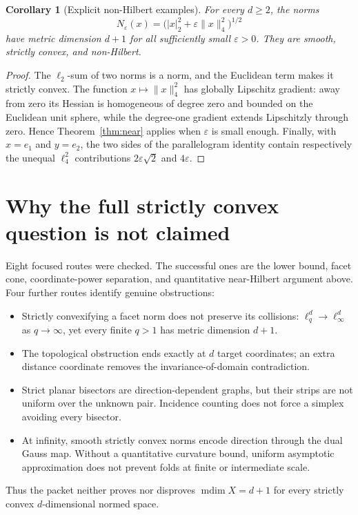 \documentclass[11pt]{amsart}
\newtheorem{corollary}[theorem]{Corollary}
\theoremstyle{remark}
\newcommand{\mdim}{\operatorname{mdim}}
\begin{document}
\begin{corollary}[Explicit non-Hilbert examples]\label{cor:example}
For every $d\ge2$, the norms
\[
 N_\varepsilon(x)
 =\bigl(|x|_2^2+\varepsilon\|x\|_4^2\bigr)^{1/2}
\]
have metric dimension $d+1$ for all sufficiently small $\varepsilon>0$.
They are smooth, strictly convex, and non-Hilbert.
\end{corollary}

\begin{proof}
The $\ell_2$-sum of two norms is a norm, and the Euclidean term makes it
strictly convex.  The function $x\mapsto\|x\|_4^2$ has globally Lipschitz
gradient: away from zero its Hessian is homogeneous of degree zero and bounded
on the Euclidean unit sphere, while the degree-one gradient extends
Lipschitzly through zero.  Hence Theorem~\ref{thm:near} applies when
$\varepsilon$ is small enough.  Finally, with $x=e_1$ and $y=e_2$, the two
sides of the parallelogram identity contain respectively the unequal
$\ell_4^2$ contributions $2\varepsilon\sqrt2$ and $4\varepsilon$.
\end{proof}

\section{Why the full strictly convex question is not claimed}

Eight focused routes were checked.  The successful ones are the lower bound,
facet cone, coordinate-power separation, and quantitative near-Hilbert
argument above.  Four further routes identify genuine obstructions:
\begin{itemize}
\item Strictly convexifying a facet norm does not preserve its collisions:
$\ell_q^d\to\ell_\infty^d$ as $q\to\infty$, yet every finite $q>1$ has metric
dimension $d+1$.
\item The topological obstruction ends exactly at $d$ target coordinates; an
extra distance coordinate removes the invariance-of-domain contradiction.
\item Strict planar bisectors are direction-dependent graphs, but their
strips are not uniform over the unknown pair.  Incidence counting does not
force a simplex avoiding every bisector.
\item At infinity, smooth strictly convex norms encode direction through the
dual Gauss map.  Without a quantitative curvature bound, uniform asymptotic
approximation does not prevent folds at finite or intermediate scale.
\end{itemize}
Thus the packet neither proves nor disproves
$\mdim X=d+1$ for every strictly convex $d$-dimensional normed space.
\end{document}
